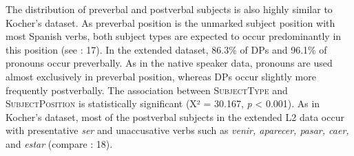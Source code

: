 \documentclass[
  letterpaper,
  DIV=11,
  numbers=noendperiod]{scrartcl}
\begin{document}
The distribution of preverbal and postverbal subjects is also highly
similar to Kocher's dataset. As preverbal position is the unmarked
subject position with most Spanish verbs, both subject types are
expected to occur predominantly in this position (see
: 17). In the extended dataset,
86.3\% of DPs and 96.1\% of pronouns occur preverbally. As in the native
speaker data, pronouns are used almost exclusively in preverbal
position, whereas DPs occur slightly more frequently postverbally. The
association between \textsc{SubjectType} and \textsc{SubjectPosition} is
statistically significant (X² = 30.167, \emph{p} \textless{} 0.001). As
in Kocher's dataset, most of the postverbal subjects in the extended L2
data occur with presentative \emph{ser} and unaccusative verbs such as
\emph{venir, aparecer, pasar, caer,} and \emph{estar} (compare
: 18).
\end{document}
